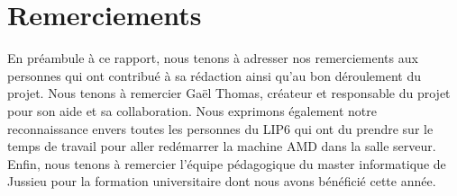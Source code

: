 \chapter*{Remerciements}

  En préambule à ce rapport, nous tenons à adresser nos remerciements aux
  personnes qui ont contribué à sa rédaction ainsi qu'au bon déroulement du
  projet. Nous tenons à remercier Gaël Thomas, créateur et responsable du projet
  pour son aide et sa collaboration. Nous exprimons également notre
  reconnaissance envers toutes les personnes du LIP6 qui ont du prendre sur le
  temps de travail pour aller redémarrer la machine AMD dans la salle
  serveur. Enfin, nous tenons à remercier l'équipe pédagogique du master
  informatique de Jussieu pour la formation universitaire dont nous avons
  bénéficié cette année.
